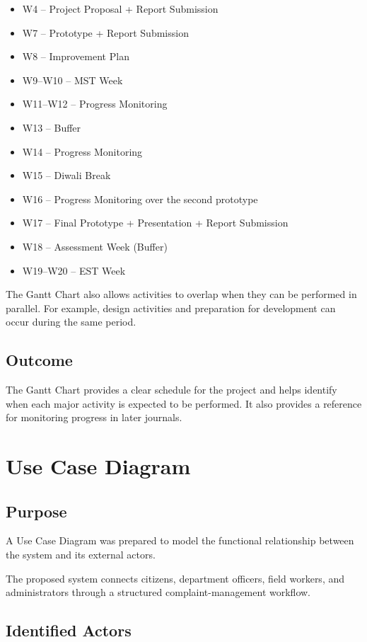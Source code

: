 \documentclass[12pt,a4paper]{article}
\begin{document}
\begin{itemize}[leftmargin=*]
\item W4 -- Project Proposal + Report Submission
\item W7 -- Prototype + Report Submission
\item W8 -- Improvement Plan
\item W9--W10 -- MST Week
\item W11--W12 -- Progress Monitoring
\item W13 -- Buffer
\item W14 -- Progress Monitoring
\item W15 -- Diwali Break
\item W16 -- Progress Monitoring over the second prototype
\item W17 -- Final Prototype + Presentation + Report Submission
\item W18 -- Assessment Week (Buffer)
\item W19--W20 -- EST Week
\end{itemize}

The Gantt Chart also allows activities to overlap when they can be performed in parallel. For example, design activities and preparation for development can occur during the same period.

\subsection{Outcome}

The Gantt Chart provides a clear schedule for the project and helps identify when each major activity is expected to be performed. It also provides a reference for monitoring progress in later journals.

\section{Use Case Diagram}

\subsection{Purpose}

A Use Case Diagram was prepared to model the functional relationship between the system and its external actors.

The proposed system connects citizens, department officers, field workers, and administrators through a structured complaint-management workflow.

\subsection{Identified Actors}
\end{document}
